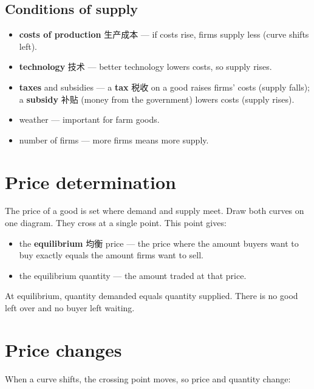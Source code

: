 \documentclass[11pt]{article}
\begin{document}
\subsection*{Conditions of supply}

\begin{itemize}
\item \textbf{costs of production} 生产成本 — if costs rise, firms supply less (curve shifts left).

\item \textbf{technology} 技术 — better technology lowers costs, so supply rises.

\item \textbf{taxes} and subsidies — a \textbf{tax} 税收 on a good raises firms' costs (supply falls); a \textbf{subsidy} 补贴 (money from the government) lowers costs (supply rises).

\item weather — important for farm goods.

\item number of firms — more firms means more supply.

\end{itemize}

\section*{Price determination}

The price of a good is set where demand and supply meet. Draw both curves on one diagram. They cross at a single point. This point gives:

\begin{itemize}
\item the \textbf{equilibrium} 均衡 price — the price where the amount buyers want to buy exactly equals the amount firms want to sell.

\item the equilibrium quantity — the amount traded at that price.

\end{itemize}

At equilibrium, quantity demanded equals quantity supplied. There is no good left over and no buyer left waiting.

\section*{Price changes}

When a curve shifts, the crossing point moves, so price and quantity change:
\end{document}
